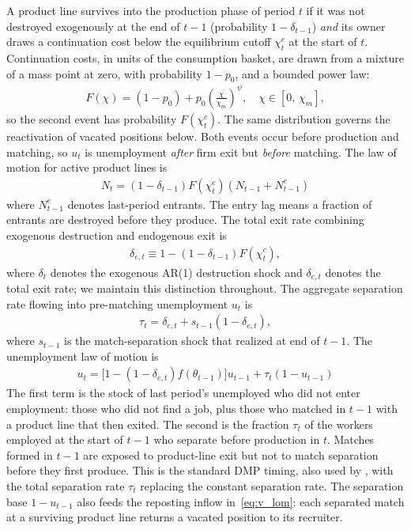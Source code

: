 \documentclass[authoryear, review, 12pt]{elsarticle}
\begin{document}
	A product line survives into  the production phase of period $t$ if it was not destroyed exogenously at the end of $t-1$ (probability 
	$1-\delta_{t-1}$) \emph{and} its owner draws a continuation cost below the equilibrium cutoff $\chi_t^c$ at the start of $t$.
	Continuation costs, in units of the consumption basket, are drawn from a mixture of a
	mass point at zero, with probability $1-p_0$, and a bounded power law:
	\begin{align}\label{eq:F_chi}
		F(\chi) = (1-p_0) + p_0\left(\frac{\chi}{\chi_m}
		\right)^\psi,
		\quad \chi\in[0,\,\chi_m],
	\end{align}
	so the second event has probability $F(\chi_t^c)$. The same distribution governs the
	reactivation of vacated positions below. Both events occur before production and
	matching, so $u_t$ is unemployment \emph{after} firm exit but
	\emph{before} matching. The law of motion for active product lines 
	is
	\begin{align}
		N_{t}=(1-\delta_{t-1})F(\chi_{t}^c)(N_{t-1}+N_{t-1}^e) 
		\label{eq:firm_law_motion}
	\end{align}
	where $N_{t-1}^e$ denotes last-period entrants. The entry lag 
	means a fraction of entrants are destroyed before they produce. 
	The total exit rate combining exogenous destruction and endogenous 
	exit is
	\begin{align}
		\delta_{e,t}\equiv 1-(1-\delta_{t-1})F(\chi_t^c), 
		\label{eq:delta_e_lom}
	\end{align}
	where $\delta_t$ denotes the exogenous AR(1) destruction shock 
	and $\delta_{e,t}$ denotes the total exit rate; we maintain this 
	distinction throughout. The aggregate separation rate flowing into 
	pre-matching unemployment $u_t$ is
	\begin{align}
		\tau_{t} = \delta_{e,t} + s_{t-1}(1-\delta_{e,t}), 
		\label{eq:tau_lom}
	\end{align}
	where $s_{t-1}$ is the match-separation shock that realized at 
	end of $t-1$. The unemployment law of motion is
	\begin{align}
		u_{t}=\bigl[1-(1-\delta_{e,t})f(\theta_{t-1})\bigr]u_{t-1}
		+\tau_{t}(1-u_{t-1})\label{eq:u_lom}
	\end{align}
	The first term is  the stock of last period's unemployed who did not enter
	employment: those who did not find a job, plus those who matched
	in $t-1$ with a product line that then exited. The second is the
	fraction $\tau_t$ of the workers employed at the start of $t-1$
	who separate before production in $t$. Matches formed in $t-1$
	are exposed to product-line exit but not to match separation
	before they first produce. This is the standard DMP timing, also
	used by \citet{gabrovski_2025}, with the total separation rate
	$\tau_t$ replacing the constant separation rate. The separation
	base $1-u_{t-1}$ also feeds the reposting inflow in~\eqref{eq:v_lom}: each separated
	match at a surviving product line returns a vacated position to its recruiter.
	
\end{document}
